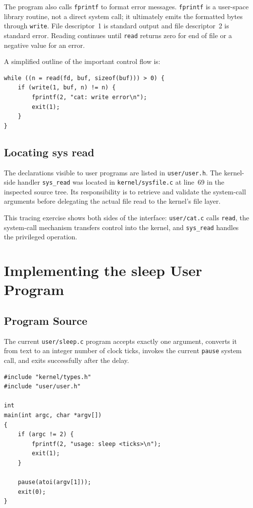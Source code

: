 \documentclass[12pt]{article}
\newcommand{\commandname}[1]{\texttt{#1}}
\begin{document}
The program also calls \commandname{fprintf} to format error messages. \commandname{fprintf} is a user-space library routine, not a direct system call; it ultimately emits the formatted bytes through \commandname{write}. File descriptor~1 is standard output and file descriptor~2 is standard error. Reading continues until \commandname{read} returns zero for end of file or a negative value for an error.

A simplified outline of the important control flow is:

\begin{lstlisting}
while ((n = read(fd, buf, sizeof(buf))) > 0) {
    if (write(1, buf, n) != n) {
        fprintf(2, "cat: write error\n");
        exit(1);
    }
}
\end{lstlisting}

\subsection{Locating sys read}

The declarations visible to user programs are listed in \commandname{user/user.h}. The kernel-side handler \commandname{sys\_read} was located in \commandname{kernel/sysfile.c} at line~69 in the inspected source tree. Its responsibility is to retrieve and validate the system-call arguments before delegating the actual file read to the kernel's file layer.

This tracing exercise shows both sides of the interface: \commandname{user/cat.c} calls \commandname{read}, the system-call mechanism transfers control into the kernel, and \commandname{sys\_read} handles the privileged operation.

\section{Implementing the sleep User Program}

\subsection{Program Source}

The current \commandname{user/sleep.c} program accepts exactly one argument, converts it from text to an integer number of clock ticks, invokes the current \commandname{pause} system call, and exits successfully after the delay.

\begin{lstlisting}[caption={Implementation of user/sleep.c}]
#include "kernel/types.h"
#include "user/user.h"

int
main(int argc, char *argv[])
{
    if (argc != 2) {
        fprintf(2, "usage: sleep <ticks>\n");
        exit(1);
    }

    pause(atoi(argv[1]));
    exit(0);
}
\end{lstlisting}
\end{document}
